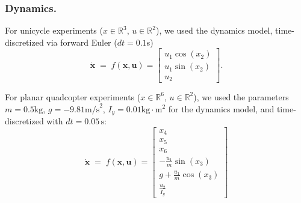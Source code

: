 \documentclass{l4dc2026}
\begin{document}
\subsubsection{Dynamics. }\label{app:dynamics}
For unicycle experiments ($x \in \mathbb{R}^3$, $u \in \mathbb{R}^2$), we used the dynamics model, time-discretized via forward Euler ($dt =0.1$s)
\begin{equation}\label{eq:unicycle}
    \dot{\mathbf{x}}\;=\; f(\mathbf{x},\mathbf{u})=
    \begin{bmatrix}
        u_1 \cos(x_2) \\ u_1 \sin(x_2) \\ u_2
    \end{bmatrix}.
\end{equation}

\noindent For planar quadcopter experiments ($x \in \mathbb{R}^6$, $u \in \mathbb{R}^2$), we used the parameters $m=0.5\textrm{kg}$, $g=-9.81\textrm{m/s}^2$, $I_y=0.01\textrm{kg} \cdot \textrm{m}^2$ for the dynamics model, and time-discretized with $dt = 0.05\,\mathrm{s}$:
\begin{equation}\label{eq:2dquad}
    \dot{\mathbf{x}}\;=\; f(\mathbf{x},\mathbf{u})=\begin{bmatrix}
        x_4 \\ x_5 \\ x_6 \\ -\frac{u_1}{m} \sin(x_3)\\ g+\frac{u_1}{m}\cos(x_3)\\\frac{u_2}{I_y}
    \end{bmatrix}
\end{equation}
\end{document}
